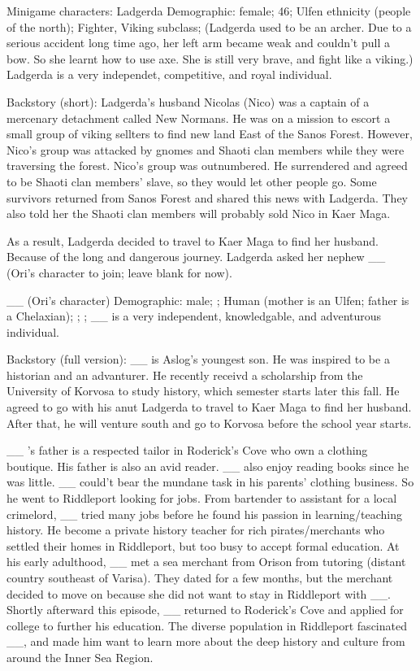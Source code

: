 Minigame characters:
Ladgerda
  Demographic: female; 46; Ulfen ethnicity (people of the north); Fighter, Viking subclass;
  (Ladgerda used to be an archer. Due to a serious accident long time ago, her left arm became weak and couldn't pull a bow.
  So she learnt how to use axe. She is still very brave, and fight like a viking.)
  Ladgerda is a very independet, competitive, and royal individual.

  Backstory (short):
  Ladgerda's husband Nicolas (Nico) was a captain of a mercenary detachment called New Normans.
  He was on a mission to escort a small group of viking sellters to find new land East of the Sanos Forest.
  However, Nico's group was attacked by gnomes and Shaoti clan members while they were traversing the forest.
  Nico's group was outnumbered. He surrendered and agreed to be Shaoti clan members' slave, so they would let other people go.
  Some survivors returned from Sanos Forest and shared this news with Ladgerda.
  They also told her the Shaoti clan members will probably sold Nico in Kaer Maga.

  As a result, Ladgerda decided to travel to Kaer Maga to find her husband.
  Because of the long and dangerous journey. Ladgerda asked her nephew __ (Ori's character to join; leave blank for now).


__ (Ori's character)
  Demographic: male; ; Human (mother is an Ulfen; father is a Chelaxian); ; ;
  __ is a very independent, knowledgable, and adventurous individual.

  Backstory (full version):
  __ is Aslog's youngest son. He was inspired to be a historian and an advanturer.
  He recently receivd a scholarship from the University of Korvosa to study history, which semester starts later this fall.
  He agreed to go with his anut Ladgerda to travel to Kaer Maga to find her husband.
  After that, he will venture south and go to Korvosa before the school year starts.

  __ 's father is a respected tailor in Roderick's Cove who own a clothing boutique. His father is also an avid reader.
  __ also enjoy reading books since he was little. __ could't bear the mundane task in his parents' clothing business.
  So he went to Riddleport looking for jobs. From bartender to assistant for a local crimelord,
  __ tried many jobs before he found his passion in learning/teaching history.
  He become a private history teacher for rich pirates/merchants who settled their homes in Riddleport, but too busy to accept formal education.
  At his early adulthood, __ met a sea merchant from Orison from tutoring (distant country southeast of Varisa).
  They dated for a few months, but the merchant decided to move on because she did not want to stay in Riddleport with __.
  Shortly afterward this episode, __ returned to Roderick's Cove and applied for college to further his education.
  The diverse population in Riddleport fascinated __,
  and made him want to learn more about the deep history and culture from around the Inner Sea Region.


